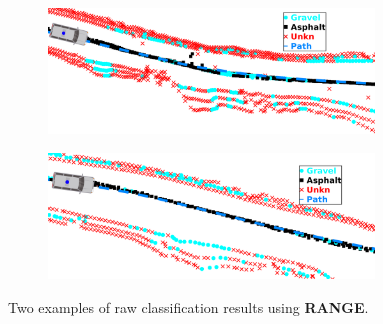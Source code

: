 \documentclass[numbered,pdftex]{ohio-etd}
\begin{document}
{{		%
		\begin{figure}[H]
			\centering
			\begin{subfigure}[b]{\textwidth}
				\centering
				\includegraphics[width=0.95\textwidth]{Defense_Images/db1range}
				\caption{}
				\label{fig:db1range}
			\end{subfigure}
			\vspace{1cm} %
			\begin{subfigure}[b]{\textwidth}
				\centering
				\includegraphics[width=0.95\textwidth]{Defense_Images/db2range}
				\caption{}
				\label{fig:db2range}
			\end{subfigure}
			\caption[Raw Result Example - RANGE Spatial Reference Point]{Two examples of raw classification results using \textbf{RANGE}. }
			\label{fig:range_raw_results_example}
		\end{figure}
		
}}
\end{document}
